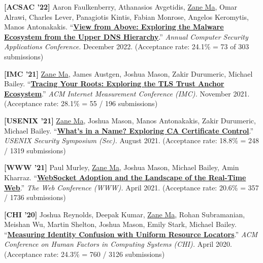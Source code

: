 \documentclass[10pt,singlecolumn]{article} %
\begin{document}
\begin{etaremune}


\item \textbf{[ACSAC '22]} 
Aaron Faulkenberry, Athanasios Avgetidis, \underline{Zane Ma}, Omar Alrawi, Charles Lever, Panagiotis Kintis, Fabian Monrose, Angelos Keromytis, Manos Antonakakis.
``\textbf{\href{}{View from Above: Exploring the Malware Ecosystem from the Upper DNS Hierarchy}}.''
\emph{Annual Computer Security Applications Conference.} December 2022.
(Acceptance rate: 24.1\% = 73 of 303 submissions)
\vspace{6pt}



\item \textbf{[IMC '21]} 
\underline{Zane Ma}, James Austgen, Joshua Mason, Zakir Durumeric, Michael Bailey.
``\textbf{\href{https://zanema.com/papers/imc21_roots.pdf}{Tracing Your Roots: Exploring the TLS Trust Anchor Ecosystem}}.''
\emph{ACM Internet Measurement Conference (IMC).} November 2021.
(Acceptance rate: 28.1\% = 55 / 196 submissions)
\vspace{6pt}


\item \textbf{[USENIX '21]}
\underline{Zane Ma}, Joshua Mason, Manos Antonakakis, Zakir Durumeric, Michael Bailey.
``\textbf{\href{https://zanema.com/papers/usenix21_ca_operators.pdf}{What's in a Name? Exploring CA Certificate Control}}.''
\emph{USENIX Security Symposium (Sec).} August 2021.
(Acceptance rate: 18.8\% = 248 / 1319 submissions)  
\vspace{6pt}


\item \textbf{[WWW '21]}
Paul Murley, \underline{Zane Ma}, Joshua Mason, Michael Bailey, Amin Kharraz.
``\textbf{\href{https://zanema.com/papers/www21_websockets.pdf}{WebSocket Adoption and the Landscape of the Real-Time Web}}.''
\emph{The Web Conference (WWW).} April 2021.
(Acceptance rate: 20.6\% = 357 / 1736 submissions)
\vspace{6pt}


\item \textbf{[CHI '20]}
Joshua Reynolds, Deepak Kumar, \underline{Zane Ma}, Rohan Subramanian, Meishan Wu, Martin Shelton, Joshua Mason, Emily Stark, Michael Bailey.
``\textbf{\href{https://zanema.com/papers/chi20_urlconfusion.pdf}{Measuring Identity Confusion with Uniform Resource Locators}}.''
\emph{ACM Conference on Human Factors in Computing Systems (CHI).} April 2020.
(Acceptance rate: 24.3\% = 760 / 3126 submissions)
\vspace{6pt}


\end{etaremune}
\end{document}

